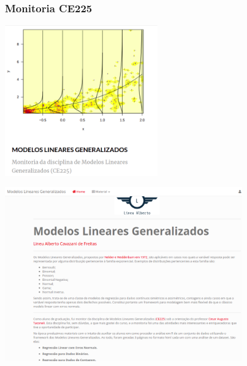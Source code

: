 \documentclass[10pt,
  aspectratio=169,
  serif,
  mathserif,
  professionalfont,
  compress,
  handout,
  ]{beamer}\usepackage[]{graphicx}\usepackage[]{color}
\begin{document}
\begin{frame}

\frametitle{Monitoria CE225}

\begin{center}
  \includegraphics[height=6.5cm]{img/monitoria1.png}
\end{center}

\end{frame}


\begin{frame}


\begin{center}
  \includegraphics[height=7.5cm]{img/glm.png}
\end{center}

\end{frame}

\end{document}
